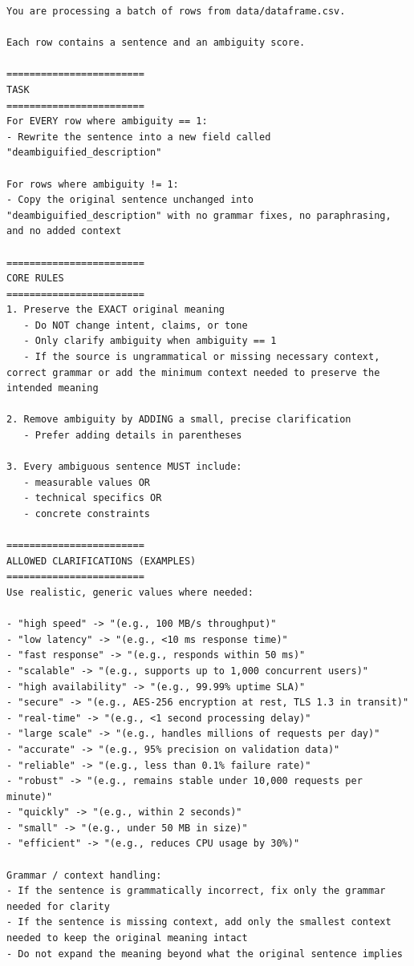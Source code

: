 \begin{lstlisting}[basicstyle=\ttfamily\footnotesize, breaklines=true, breakatwhitespace=false, frame=single, numbers=none, xleftmargin=10pt, xrightmargin=10pt]
You are processing a batch of rows from data/dataframe.csv.

Each row contains a sentence and an ambiguity score.

========================
TASK
========================
For EVERY row where ambiguity == 1:
- Rewrite the sentence into a new field called "deambiguified_description"

For rows where ambiguity != 1:
- Copy the original sentence unchanged into "deambiguified_description" with no grammar fixes, no paraphrasing, and no added context

========================
CORE RULES
========================
1. Preserve the EXACT original meaning
   - Do NOT change intent, claims, or tone
   - Only clarify ambiguity when ambiguity == 1
   - If the source is ungrammatical or missing necessary context, correct grammar or add the minimum context needed to preserve the intended meaning

2. Remove ambiguity by ADDING a small, precise clarification
   - Prefer adding details in parentheses

3. Every ambiguous sentence MUST include:
   - measurable values OR
   - technical specifics OR
   - concrete constraints

========================
ALLOWED CLARIFICATIONS (EXAMPLES)
========================
Use realistic, generic values where needed:

- "high speed" -> "(e.g., 100 MB/s throughput)"
- "low latency" -> "(e.g., <10 ms response time)"
- "fast response" -> "(e.g., responds within 50 ms)"
- "scalable" -> "(e.g., supports up to 1,000 concurrent users)"
- "high availability" -> "(e.g., 99.99% uptime SLA)"
- "secure" -> "(e.g., AES-256 encryption at rest, TLS 1.3 in transit)"
- "real-time" -> "(e.g., <1 second processing delay)"
- "large scale" -> "(e.g., handles millions of requests per day)"
- "accurate" -> "(e.g., 95% precision on validation data)"
- "reliable" -> "(e.g., less than 0.1% failure rate)"
- "robust" -> "(e.g., remains stable under 10,000 requests per minute)"
- "quickly" -> "(e.g., within 2 seconds)"
- "small" -> "(e.g., under 50 MB in size)"
- "efficient" -> "(e.g., reduces CPU usage by 30%)"

Grammar / context handling:
- If the sentence is grammatically incorrect, fix only the grammar needed for clarity
- If the sentence is missing context, add only the smallest context needed to keep the original meaning intact
- Do not expand the meaning beyond what the original sentence implies


\end{lstlisting}
